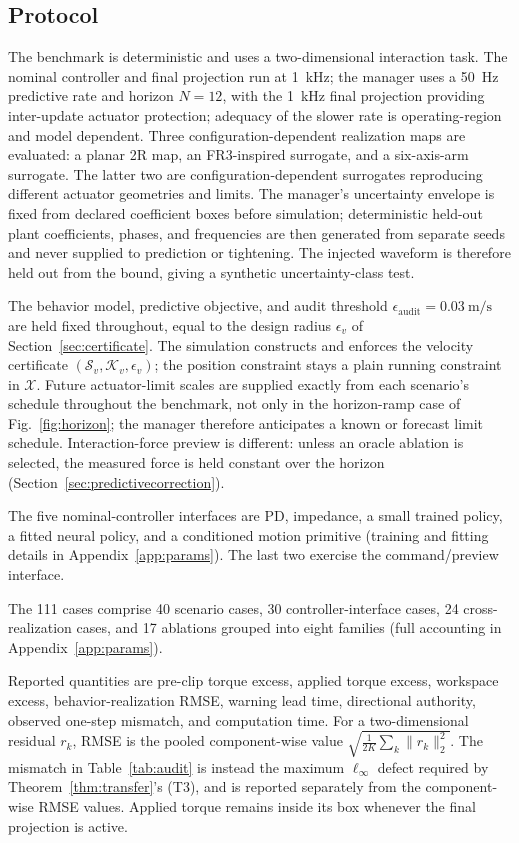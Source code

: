 \documentclass[journal]{IEEEtran}
\begin{document}
\subsection{Protocol}

The benchmark is deterministic and uses a two-dimensional interaction task. The nominal controller and final projection run at 1~kHz; the manager uses a 50~Hz predictive rate and horizon $N=12$, with the 1~kHz final projection providing inter-update actuator protection; adequacy of the slower rate is operating-region and model dependent. Three configuration-dependent realization maps are evaluated: a planar 2R map, an FR3-inspired surrogate, and a six-axis-arm surrogate. The latter two are configuration-dependent surrogates reproducing different actuator geometries and limits. The manager's uncertainty envelope is fixed from declared coefficient boxes before simulation; deterministic held-out plant coefficients, phases, and frequencies are then generated from separate seeds and never supplied to prediction or tightening. The injected waveform is therefore held out from the bound, giving a synthetic uncertainty-class test.

The behavior model, predictive objective, and audit threshold $\epsilon_{\mathrm{audit}}=0.03~\mathrm{m/s}$ are held fixed throughout, equal to the design radius $\epsilon_v$ of Section~\ref{sec:certificate}. The simulation constructs and enforces the velocity certificate $(\mathcal S_v,\mathcal K_v,\epsilon_v)$; the position constraint stays a plain running constraint in $\mathcal X$. Future actuator-limit scales are supplied exactly from each scenario's schedule throughout the benchmark, not only in the horizon-ramp case of Fig.~\ref{fig:horizon}; the manager therefore anticipates a known or forecast limit schedule. Interaction-force preview is different: unless an oracle ablation is selected, the measured force is held constant over the horizon (Section~\ref{sec:predictivecorrection}).

The five nominal-controller interfaces are PD, impedance, a small trained policy, a fitted neural policy, and a conditioned motion primitive (training and fitting details in Appendix~\ref{app:params}). The last two exercise the command/preview interface.

The 111 cases comprise 40 scenario cases, 30 controller-interface cases, 24 cross-realization cases, and 17 ablations grouped into eight families (full accounting in Appendix~\ref{app:params}).

Reported quantities are pre-clip torque excess, applied torque excess, workspace excess, behavior-realization RMSE, warning lead time, directional authority, observed one-step mismatch, and computation time. For a two-dimensional residual $r_k$, RMSE is the pooled component-wise value $\sqrt{\frac{1}{2K}\sum_k\|r_k\|_2^2}$. The mismatch in Table~\ref{tab:audit} is instead the maximum $\ell_\infty$ defect required by Theorem~\ref{thm:transfer}'s (T3), and is reported separately from the component-wise RMSE values. Applied torque remains inside its box whenever the final projection is active.
\end{document}
